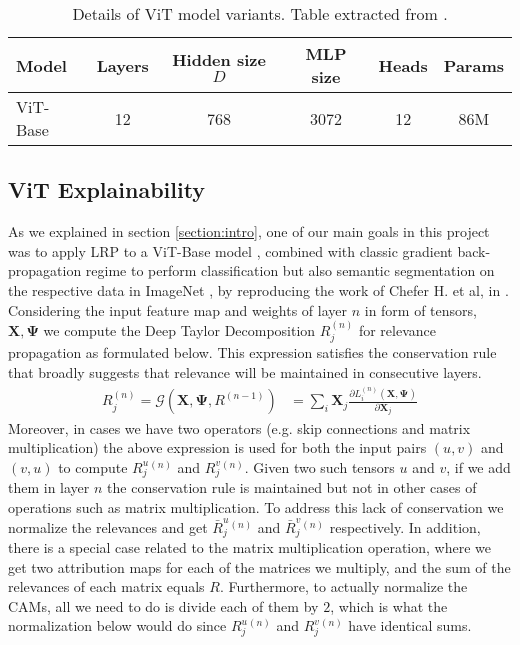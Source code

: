 \begin{table*}[]
\centering
\small
\begin{tabular}{l c c c c c}
\toprule
Model            & Layers & Hidden size $D$ & MLP size &  Heads  & Params \\
\midrule 
ViT-Base   &   12   &        768      &   3072   &   12    &   86M  \\
\bottomrule
\end{tabular}
\caption{Details of ViT model variants. Table extracted from \cite{visiontransformer}.}
\label{tbl:models}
\AND\end{table*}

\subsection{ViT Explainability}
\label{sub:3.2}
As we explained in section \ref{section:intro}, one of our main goals in this project was to apply LRP \cite{renormalizationLRP} to a ViT-Base model \cite{visiontransformer}, combined with classic gradient back-propagation regime to perform classification but also semantic segmentation on the respective data in ImageNet \cite{russakovsky2015ImageNet, imagenet-seg}, by reproducing the work of Chefer H. et al, in \cite{mainpaper}. Considering the input feature map and weights of layer $n$ in form
of tensors, $\mathbf{X}, \mathbf{\Psi}$ we compute the Deep Taylor Decomposition $R_j^{(n)}$ for relevance propagation as formulated below. This expression satisfies the conservation rule that broadly suggests that relevance will be maintained in consecutive layers.
\begin{align}
    \label{eq:relevance}
    \nonumber
    R_j^{(n)} = \mathcal{G}\left(\mathbf{X}, \mathbf{\Psi}, R^{(n-1)}\right)
    &= \sum_{i} \mathbf{X}_j \frac{\partial L_i^{(n)}(\mathbf{X, \Psi})}{\partial\textbf{X}_j}
\end{align}
Moreover, in cases we have two operators (e.g. skip connections and matrix multiplication) the above expression is used for both the input pairs $(u, v)$ and $(v, u)$ to compute $R_j^{u}^{(n)}$ and $R_j^{v}^{(n)}$. Given two such tensors $u$ and $v$, if we add them in layer $n$ the conservation rule is maintained but not in other cases of operations such as matrix multiplication. To address this lack of conservation we normalize the relevances and get $\bar{R}_j^{u}^{(n)}$ and $\bar{R}_j^{v}^{(n)}$ respectively. In addition, there is a special case related to the matrix multiplication operation, where we get two attribution maps for each of the matrices we multiply, and the sum of the relevances of each matrix equals $R$. Furthermore, to actually normalize the CAMs, all we need to do is divide each of them by $2$, which is what the normalization below would do since $R_j^{u}^{(n)}$ and $R_j^{v}^{(n)}$ have identical sums.

